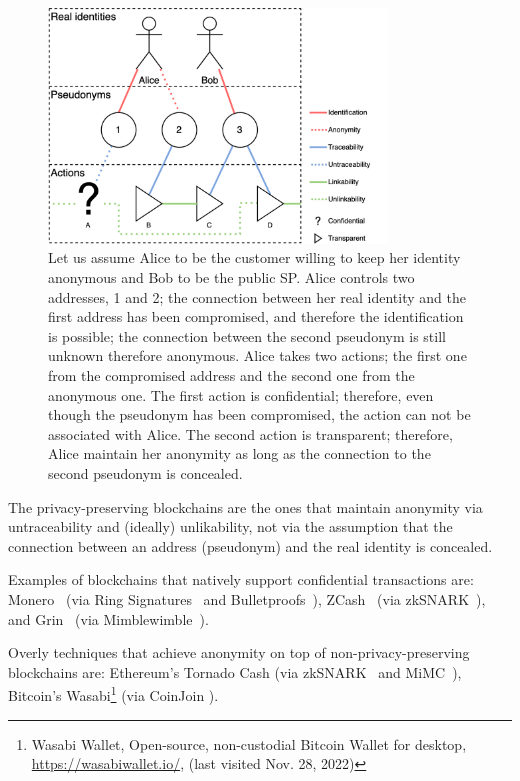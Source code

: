 \documentclass{ieeeaccess}
\begin{document}
\begin{figure}[h!]
\includegraphics[width=9cm]{anonymity-diagram.png}
\centering
\caption{Let us assume Alice to be the customer willing to keep her identity anonymous and Bob to be the public SP. Alice controls two addresses, 1 and 2; the connection between her real identity and the first address has been compromised, and therefore the identification is possible; the connection between the second pseudonym is still unknown therefore anonymous. Alice takes two actions; the first one from the compromised address and the second one from the anonymous one. The first action is confidential; therefore, even though the pseudonym has been compromised, the action can not be associated with Alice. The second action is transparent; therefore, Alice maintain her anonymity as long as the connection to the second pseudonym is concealed.}

\label{fig:anonymity-diagram}
\end{figure}

The privacy-preserving blockchains are the ones that maintain anonymity via untraceability and (ideally) unlikability, not via the assumption that the connection between an address (pseudonym) and the real identity is concealed.   

Examples of blockchains that natively support confidential transactions are: Monero~\cite{vansaberhagenCryptoNote2013} (via Ring Signatures~\cite{noetherRingSignatureConfidential2015} and Bulletproofs~\cite{moneroBulletproofsMoneropediaMonero, bunzBulletproofsShortProofs2018}), ZCash~\cite{ben-sassonZerocashDecentralizedAnonymous2014} (via zkSNARK~\cite{ben-sassonSNARKsVerifyingProgram2013}), and Grin~\cite{fuchsbauerAggregateCashSystems2019} (via Mimblewimble~\cite{jedusorMIMBLEWIMBLE2016}).

Overly techniques that achieve anonymity on top of non-privacy-preserving blockchains are: Ethereum's Tornado Cash\cite{pertsevTornadoCashPrivacy2019} (via zkSNARK~\cite{grothSizePairingbasedNoninteractive2016} and MiMC~\cite{albrechtMiMCEfficientEncryption2016}), Bitcoin's Wasabi\footnote{Wasabi Wallet, Open-source, non-custodial Bitcoin Wallet for desktop, \url{https://wasabiwallet.io/}, (last visited Nov. 28, 2022)} (via CoinJoin \cite{maxwellCoinJoinBitcoinPrivacy2013}).
\end{document}
